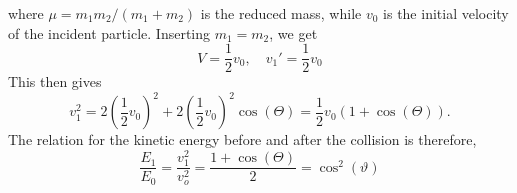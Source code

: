 \documentclass{article}
\begin{document}
    where $\mu = m_1m_2 / (m_1 + m_2)$ is the reduced mass, while $v_0$ is the initial velocity of the incident particle. Inserting $m_1 = m_2$, we get
    \begin{equation*}
        V = \frac{1}{2}v_0, \quad v_1' = \frac{1}{2}v_0
    \end{equation*}
    This then gives
    \begin{equation*}
        v_1^2 = 2(\frac{1}{2}v_0)^2 + 2 (\frac{1}{2}v_0)^2 \cos(\Theta) = \frac{1}{2}v_0 (1 + \cos(\Theta)).
    \end{equation*}
        The relation for the kinetic energy before and after the collision is therefore,
    \begin{equation*}
        \frac{E_1}{E_0} = \frac{v_1^2}{v_o^2} = \frac{1 + \cos(\Theta)}{2} = \cos^2(\vartheta)
    \end{equation*}
\end{document}
